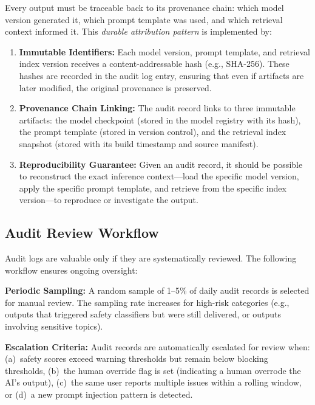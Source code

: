 Every output must be traceable back to its provenance chain: which model version generated it, which prompt template was used, and which retrieval context informed it. This \emph{durable attribution pattern} is implemented by:
\begin{enumerate}
    \item \textbf{Immutable Identifiers:} Each model version, prompt template, and retrieval index version receives a content-addressable hash (e.g., SHA-256). These hashes are recorded in the audit log entry, ensuring that even if artifacts are later modified, the original provenance is preserved.
    \item \textbf{Provenance Chain Linking:} The audit record links to three immutable artifacts: the model checkpoint (stored in the model registry with its hash), the prompt template (stored in version control), and the retrieval index snapshot (stored with its build timestamp and source manifest).
    \item \textbf{Reproducibility Guarantee:} Given an audit record, it should be possible to reconstruct the exact inference context---load the specific model version, apply the specific prompt template, and retrieve from the specific index version---to reproduce or investigate the output.
\end{enumerate}

\subsection{Audit Review Workflow}\label{sec:ch11_audit_review}

Audit logs are valuable only if they are systematically reviewed. The following workflow ensures ongoing oversight:

\textbf{Periodic Sampling:} A random sample of 1--5\% of daily audit records is selected for manual review. The sampling rate increases for high-risk categories (e.g., outputs that triggered safety classifiers but were still delivered, or outputs involving sensitive topics).

\textbf{Escalation Criteria:} Audit records are automatically escalated for review when: (a)~safety scores exceed warning thresholds but remain below blocking thresholds, (b)~the human override flag is set (indicating a human overrode the AI's output), (c)~the same user reports multiple issues within a rolling window, or (d)~a new prompt injection pattern is detected.

